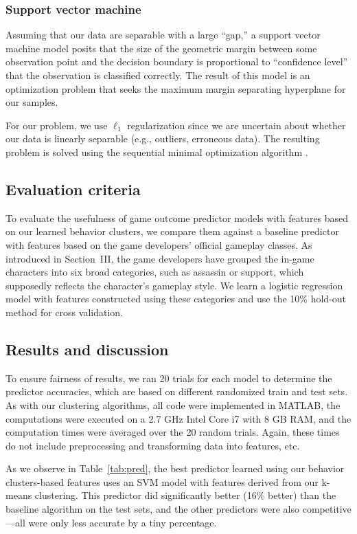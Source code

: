 \documentclass[letterpaper,10 pt,conference]{ieeeconf}
\begin{document}
\subsubsection{Support vector machine}

Assuming that our data are separable with a large ``gap,'' a support vector machine model posits that the size of the geometric margin between some observation point and the decision boundary is proportional to ``confidence level'' that the observation is classified correctly. The result of this model is an optimization problem that seeks the maximum margin separating hyperplane for our samples. 

For our problem, we use $\ell_{1}$ regularization since we are uncertain about whether our data is linearly separable (e.g., outliers, erroneous data). The resulting problem is solved using the sequential minimal optimization algorithm \cite{SBS:99}.

\subsection{Evaluation criteria}

To evaluate the usefulness of game outcome predictor models with features based on our learned behavior clusters, we compare them against a baseline predictor with features based on the game developers' official gameplay classes. As introduced in Section~III, the game developers have grouped the in-game characters into six broad categories, such as assassin or support, which supposedly reflects the character's gameplay style. We learn a logistic regression model with features constructed using these categories and use the 10\% hold-out method for cross validation. 

\subsection{Results and discussion}

To ensure fairness of results, we ran 20 trials for each model to determine the predictor accuracies, which are based on different randomized train and test sets. As with our clustering algorithms, all code were implemented in MATLAB, the computations were executed on a 2.7 GHz Intel Core i7 with 8 GB RAM, and the computation times were averaged over the 20 random trials. Again, these times do not include preprocessing and transforming data into features, etc.

As we observe in Table~\ref{tab:pred}, the best predictor learned using our behavior clusters-based features uses an SVM model with features derived from our k-means clustering. This predictor did significantly better (16\% better) than the baseline algorithm on the test sets, and the other predictors were also competitive---all were only less accurate by a tiny percentage. 
\end{document}
